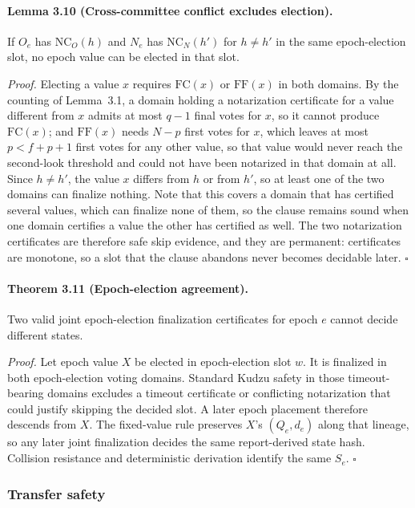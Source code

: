 \documentclass[10pt,twocolumn]{article}
\newcommand{\NC}{\mathrm{NC}}
\newcommand{\FC}{\mathrm{FC}}
\newcommand{\FF}{\mathrm{FF}}
\begin{document}
\paragraph{Lemma 3.10 (Cross-committee conflict excludes election).} If $O_e$ has $\NC_O(h)$ and $N_e$ has $\NC_N(h')$ for $h\ne h'$ in the same epoch-election slot, no epoch value can be elected in that slot.

\emph{Proof.} Electing a value $x$ requires $\FC(x)$ or $\FF(x)$ in both domains. By the counting of Lemma~3.1, a domain holding a notarization certificate for a value different from $x$ admits at most $q-1$ final votes for $x$, so it cannot produce $\FC(x)$; and $\FF(x)$ needs $N-p$ first votes for $x$, which leaves at most $p<f+p+1$ first votes for any other value, so that value would never reach the second-look threshold and could not have been notarized in that domain at all. Since $h\ne h'$, the value $x$ differs from $h$ or from $h'$, so at least one of the two domains can finalize nothing. Note that this covers a domain that has certified several values, which can finalize none of them, so the clause remains sound when one domain certifies a value the other has certified as well. The two notarization certificates are therefore safe skip evidence, and they are permanent: certificates are monotone, so a slot that the clause abandons never becomes decidable later. $\square$

\paragraph{Theorem 3.11 (Epoch-election agreement).} Two valid joint epoch-election finalization certificates for epoch $e$ cannot decide different states.

\emph{Proof.} Let epoch value $X$ be elected in epoch-election slot $w$. It is finalized in both epoch-election voting domains. Standard Kudzu safety in those timeout-bearing domains excludes a timeout certificate or conflicting notarization that could justify skipping the decided slot. A later epoch placement therefore descends from $X$. The fixed-value rule preserves $X$'s $(Q_e,d_e)$ along that lineage, so any later joint finalization decides the same report-derived state hash. Collision resistance and deterministic derivation identify the same $S_e$. $\square$

\subsubsection{Transfer safety}
\end{document}
